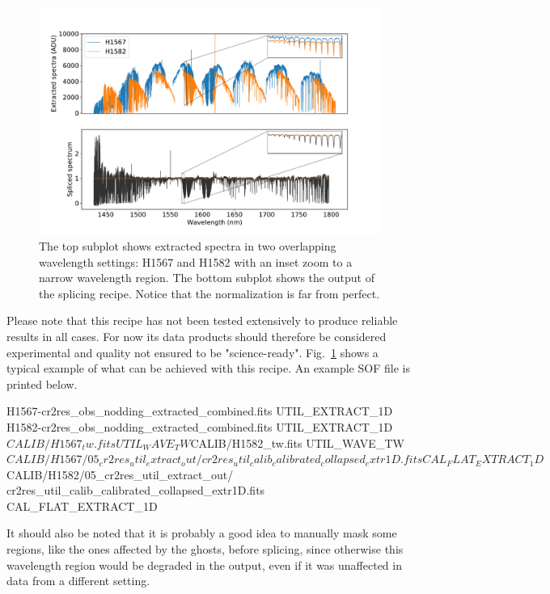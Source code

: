 \begin{figure}[!h]
  \begin{center}
    \includegraphics[width=1\textwidth]{figures/util_splice}
  \end{center}
  \caption{
    \label{fig:util_splice}
    The top subplot shows extracted spectra in two overlapping
    wavelength settings: H1567 and H1582 with an inset zoom to a narrow
    wavelength region. The bottom subplot shows the output of the splicing
    recipe. Notice that the normalization is far from perfect.}
\end{figure}

Please note that this recipe has not been tested extensively to produce reliable
results in all cases. For now its data products should therefore be considered
experimental and quality not ensured to be "science-ready". Fig.~\ref{fig:util_splice}
shows a typical example of what can be achieved with this recipe. An example SOF
file is printed below.

\begin{shell}[fontsize=\small]
H1567-cr2res_obs_nodding_extracted_combined.fits UTIL_EXTRACT_1D
H1582-cr2res_obs_nodding_extracted_combined.fits UTIL_EXTRACT_1D
$CALIB/H1567_tw.fits UTIL_WAVE_TW
$CALIB/H1582_tw.fits UTIL_WAVE_TW
$CALIB/H1567/05_cr2res_util_extract_out/
  cr2res_util_calib_calibrated_collapsed_extr1D.fits CAL_FLAT_EXTRACT_1D
$CALIB/H1582/05_cr2res_util_extract_out/
  cr2res_util_calib_calibrated_collapsed_extr1D.fits CAL_FLAT_EXTRACT_1D
\end{shell}

It should also be noted that it is probably a good idea to manually mask some
regions, like the ones affected by the ghosts, before splicing, since otherwise
this wavelength region would be degraded in the output, even if it was
unaffected in data from a different setting. 

